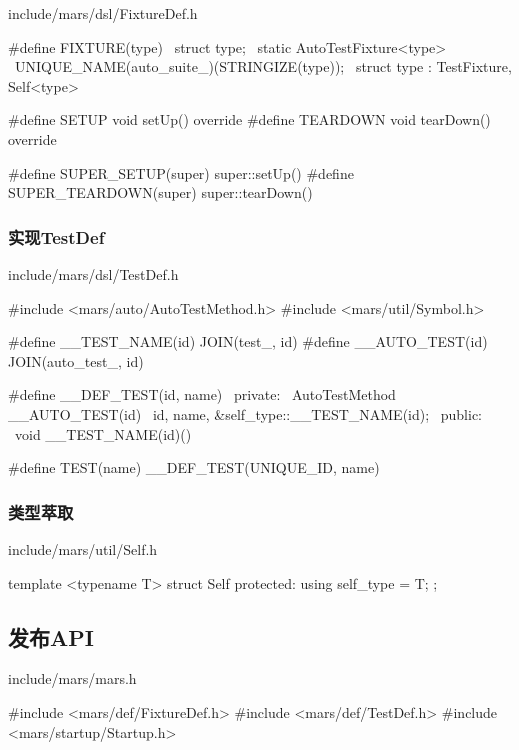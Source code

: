 \begin{content}
\begin{nodiff}{include/mars/dsl/FixtureDef.h}
\begin{c++}
#define FIXTURE(type)                        \
struct type;                                 \
static AutoTestFixture<type>                 \
  UNIQUE_NAME(auto_suite_)(STRINGIZE(type)); \
struct type : TestFixture, Self<type>

#define SETUP    void setUp() override
#define TEARDOWN void tearDown() override

#define SUPER_SETUP(super)    super::setUp()
#define SUPER_TEARDOWN(super) super::tearDown()
 \end{c++}
\end{nodiff}

\subsubsection{实现TestDef}

\begin{nodiff}{include/mars/dsl/TestDef.h}
 \begin{c++}
#include <mars/auto/AutoTestMethod.h>
#include <mars/util/Symbol.h>

#define __TEST_NAME(id) JOIN(test_, id)
#define __AUTO_TEST(id) JOIN(auto_test_, id)

#define __DEF_TEST(id, name)               \
private:                                   \
AutoTestMethod __AUTO_TEST(id)             \
  {id, name, &self_type::__TEST_NAME(id)}; \
public:                                    \
void __TEST_NAME(id)()

#define TEST(name) __DEF_TEST(UNIQUE_ID, name)
 \end{c++}
\end{nodiff}

\subsubsection{类型萃取}

\begin{nodiff}{include/mars/util/Self.h}
 \begin{c++}
template <typename T>
struct Self {
protected:
  using self_type = T;
};
 \end{c++}
\end{nodiff}

\subsection{发布API}

\begin{nodiff}{include/mars/mars.h}
 \begin{c++}
#include <mars/def/FixtureDef.h>
#include <mars/def/TestDef.h>
#include <mars/startup/Startup.h>
 \end{c++}
\end{nodiff}

\end{content}